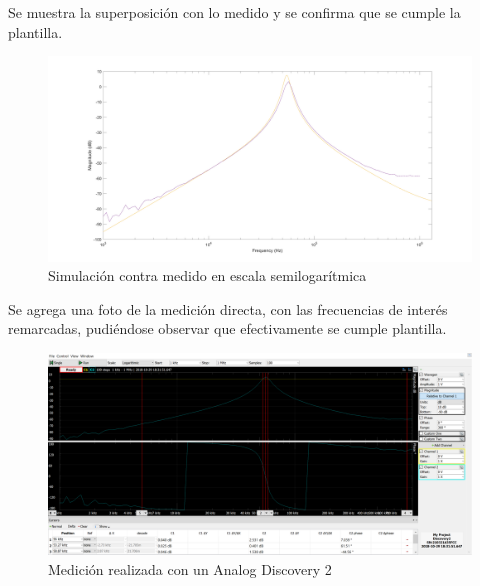 \documentclass[../../tc_tp5_main.tex]{subfiles}
\begin{document}
	Se muestra la superposición con lo medido y se confirma que se cumple la plantilla.
	 	\begin{figure}[H]	%
	\centering
	\includegraphics[scale=0.2]{imagenes/montecarlo_superpuesto.png}
	\caption{Simulación contra medido en escala semilogarítmica}
	\label{fig:ej2_montecarlo_superpuesto}
	\end{figure}
	
	Se agrega una foto de la medición directa, con las frecuencias de interés remarcadas, pudiéndose observar que efectivamente se cumple plantilla.
	
	\begin{figure}[H]	%
	\centering
	\includegraphics[scale=0.5]{imagenes/defaultc.png}
	\caption{Medición realizada con un Analog Discovery 2}
	\label{fig:ej2_defaultc}
	\end{figure}
	

 	 
 	 \subsection{}
\clearpage\newpage
\end{document}
